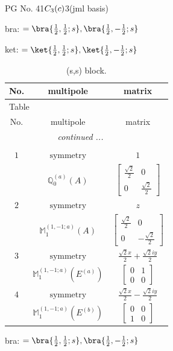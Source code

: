 \documentclass[fleqn,8pt,landscape]{jsarticle}
\begin{document}
\setcounter{MaxMatrixCols}{32}

\renewcommand{\tablename}{Table~}
\renewcommand{\figurename}{Figure~}
\begin{center}
\LARGE
PG No. 41\quad$C_{\rm 3}(c)$\quad$3$\quad[ trigonal ] (jml basis)
\end{center}
bra: $=\bra{\frac{1}{2},\frac{1}{2};s}, \bra{\frac{1}{2},- \frac{1}{2};s}$

\noindent
ket: $=\ket{\frac{1}{2},\frac{1}{2};s}, \ket{\frac{1}{2},- \frac{1}{2};s}$
\renewcommand{\arraystretch}{1.6}
\begin{longtable}{ccc}
\caption{(s,s) block.}
 \\
 \hline \hline
No. & multipole & matrix \\ \hline \endfirsthead

\multicolumn{2}{l}{\tablename\ \thetable{}} \\
 \hline \hline
No. & multipole & matrix \\ \hline \endhead

 \hline \hline
\multicolumn{2}{r}{\footnotesize\it continued ...} \\ \endfoot

 \hline \hline
\multicolumn{2}{r}{} \\ \endlastfoot

$ 1 $ & $ \text{symmetry} $ & $ 1 $ \\
$  $ & $ \mathbb{Q}_{0}^{(a)}(A) $ & $ \begin{bmatrix} \frac{\sqrt{2}}{2} & 0 \\ 0 & \frac{\sqrt{2}}{2} \end{bmatrix} $ \\ \hline
$ 2 $ & $ \text{symmetry} $ & $ z $ \\
$  $ & $ \mathbb{M}_{1}^{(1,-1;a)}(A) $ & $ \begin{bmatrix} \frac{\sqrt{2}}{2} & 0 \\ 0 & - \frac{\sqrt{2}}{2} \end{bmatrix} $ \\ \hline
$ 3 $ & $ \text{symmetry} $ & $ \frac{\sqrt{2} x}{2} + \frac{\sqrt{2} i y}{2} $ \\
$  $ & $ \mathbb{M}_{1}^{(1,-1;a)}(E^{(a)}) $ & $ \begin{bmatrix} 0 & 1 \\ 0 & 0 \end{bmatrix} $ \\ \hline
$ 4 $ & $ \text{symmetry} $ & $ \frac{\sqrt{2} x}{2} - \frac{\sqrt{2} i y}{2} $ \\
$  $ & $ \mathbb{M}_{1}^{(1,-1;a)}(E^{(b)}) $ & $ \begin{bmatrix} 0 & 0 \\ 1 & 0 \end{bmatrix} $ \\ \hline
\end{longtable}
bra: $=\bra{\frac{1}{2},\frac{1}{2};s}, \bra{\frac{1}{2},- \frac{1}{2};s}$
\end{document}
